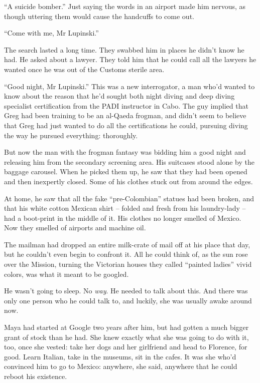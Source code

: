 “A suicide bomber.” Just saying the words in an airport made him 
nervous, as though uttering them would cause the handcuffs to come out.

“Come with me, Mr Lupinski.”

\tb

The search lasted a long time. They swabbed him in places he didn't 
know he had. He asked about a lawyer. They told him that he could call 
all the lawyers he wanted once he was out of the Customs sterile area.

“Good night, Mr Lupinski.” This was a new interrogator, a man who'd 
wanted to know about the reason that he'd sought both night diving and 
deep diving specialist certification from the PADI instructor in Cabo. 
The guy implied that Greg had been training to be an al-Qaeda frogman, 
and didn't seem to believe that Greg had just wanted to do all the 
certifications he could, pursuing diving the way he pursued everything: 
thoroughly.

But now the man with the frogman fantasy was bidding him a good night 
and releasing him from the secondary screening area. His suitcases 
stood alone by the baggage carousel. When he picked them up, he saw 
that they had been opened and then inexpertly closed. Some of his 
clothes stuck out from around the edges.

At home, he saw that all the fake “pre-Colombian” statues had been 
broken, and that his white cotton Mexican shirt -- folded and fresh 
from his laundry-lady -- had a boot-print in the middle of it. His 
clothes no longer smelled of Mexico. Now they smelled of airports and 
machine oil.

The mailman had dropped an entire milk-crate of mail off at his place 
that day, but he couldn't even begin to confront it. All he could think 
of, as the sun rose over the Mission, turning the Victorian houses they 
called “painted ladies” vivid colors, was what it meant to be 
googled.

He wasn't going to sleep. No \emph{way}. He needed to talk about this. 
And there was only one person who he could talk to, and luckily, she 
was usually awake around now.

\tb

Maya had started at Google two years after him, but had gotten a much 
bigger grant of stock than he had. She knew exactly what she was going 
to do with it, too, once she vested: take her dogs and her girlfriend 
and head to Florence, for good. Learn Italian, take in the museums, sit 
in the cafes. It was she who'd convinced him to go to Mexico: anywhere, 
she said, anywhere that he could reboot his existence.

